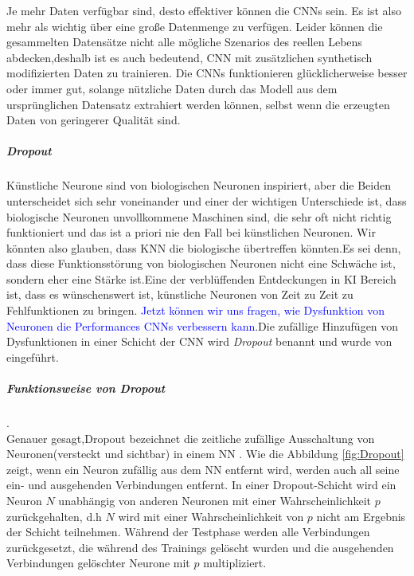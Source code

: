 \documentclass[12pt,a4paper]{scrartcl}
\numberwithin{equation}{section}
\begin{document}
Je mehr Daten verfügbar sind, desto effektiver können die \acsp{CNN} sein. Es ist also mehr als wichtig über eine große Datenmenge zu verfügen. Leider können die gesammelten Datensätze nicht alle mögliche Szenarios des reellen Lebens abdecken,deshalb ist es auch bedeutend, \ac{CNN}  mit zusätzlichen synthetisch modifizierten Daten zu trainieren. Die \acsp{CNN} funktionieren glücklicherweise besser oder immer gut, solange nützliche Daten durch das Modell aus dem ursprünglichen Datensatz extrahiert werden können, selbst wenn die erzeugten Daten von geringerer Qualität sind.\\


\subparagraph{Dropout}  \label{Dropout}
Künstliche Neurone sind von biologischen Neuronen inspiriert, aber die Beiden unterscheidet sich sehr voneinander und einer der wichtigen Unterschiede ist, dass biologische Neuronen unvollkommene Maschinen sind, die sehr oft nicht richtig funktioniert und das ist a priori nie den Fall bei  künstlichen Neuronen. Wir könnten also glauben, dass \ac{KNN} die biologische übertreffen könnten.Es sei denn, dass diese Funktionsstörung von biologischen Neuronen nicht eine Schwäche ist, sondern eher eine Stärke ist.Eine der verblüffenden Entdeckungen in \ac{KI} Bereich ist, dass es wünschenswert ist, künstliche Neuronen von Zeit zu Zeit zu Fehlfunktionen zu bringen\cite{1}. \textcolor{blue}{Jetzt können wir uns fragen, wie Dysfunktion von Neuronen die Performances \acsp{CNN} verbessern kann}.Die zufällige Hinzufügen von Dysfunktionen in einer Schicht der \ac{CNN} wird \textit{Dropout} benannt und wurde von \cite[Geoffrey E. et al]{2} eingeführt.
\subparagraph{Funktionsweise von Dropout}.\\
Genauer gesagt,Dropout bezeichnet die zeitliche zufällige Ausschaltung von Neuronen(versteckt und sichtbar)  in einem  \ac{NN} \cite{3}. Wie die Abbildung \ref{fig:Dropout} zeigt, wenn ein Neuron zufällig aus dem \ac{NN} entfernt wird, werden auch all seine ein- und ausgehenden Verbindungen entfernt.
In einer Dropout-Schicht wird ein Neuron $ \textit{N} $ unabhängig von anderen Neuronen mit einer Wahrscheinlichkeit $ {p} $ zurückgehalten, d.h $ \textit{N} $ wird mit einer Wahrscheinlichkeit von $ {p} $ nicht am Ergebnis der Schicht teilnehmen. Während der Testphase  werden alle Verbindungen zurückgesetzt, die während des Trainings gelöscht wurden und die ausgehenden Verbindungen gelöschter Neurone mit $ p $   multipliziert.
\end{document}
